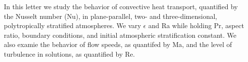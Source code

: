 \documentclass[aps, prl, twocolumn, nofootinbib, groupedaddress, amsfonts, amssymb, amsmath]{revtex4-1}
\newcommand{\nrho}{\ensuremath{n_{\rho}}}
\begin{document}

In this letter we study the behavior of convective heat transport, 
quantified by the Nusselt number (Nu), in plane-parallel, 
two- and three-dimensional, polytropically stratified atmospheres.  
We vary $\epsilon$ and Ra while holding Pr, aspect ratio, boundary conditions,
and initial atmospheric stratification
constant.  We also examie the behavior of flow speeds, as quantifed by Ma,
and the level of turbulence in solutions, as quantified by Re.
\end{document}
